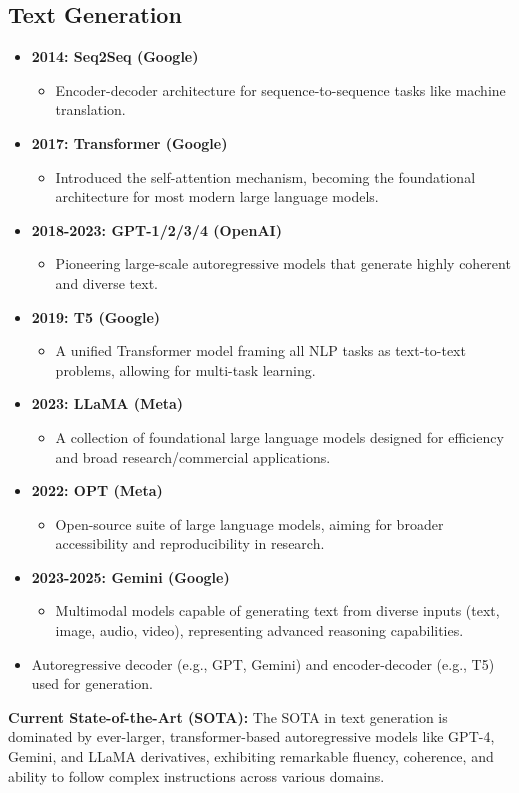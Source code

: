 \documentclass{article}
\begin{document}
\subsection{Text Generation}
\begin{itemize}[leftmargin=1.5em]
\item \textbf{2014: Seq2Seq (Google)}
  \begin{itemize}
    \item Encoder-decoder architecture for sequence-to-sequence tasks like machine translation.
  \end{itemize}
\item \textbf{2017: Transformer (Google)}
  \begin{itemize}
    \item Introduced the self-attention mechanism, becoming the foundational architecture for most modern large language models.
  \end{itemize}
\item \textbf{2018-2023: GPT-1/2/3/4 (OpenAI)}
  \begin{itemize}
    \item Pioneering large-scale autoregressive models that generate highly coherent and diverse text.
  \end{itemize}
\item \textbf{2019: T5 (Google)}
  \begin{itemize}
    \item A unified Transformer model framing all NLP tasks as text-to-text problems, allowing for multi-task learning.
  \end{itemize}
\item \textbf{2023: LLaMA (Meta)}
  \begin{itemize}
    \item A collection of foundational large language models designed for efficiency and broad research/commercial applications.
  \end{itemize}
\item \textbf{2022: OPT (Meta)}
  \begin{itemize}
    \item Open-source suite of large language models, aiming for broader accessibility and reproducibility in research.
  \end{itemize}
\item \textbf{2023-2025: Gemini (Google)}
  \begin{itemize}
    \item Multimodal models capable of generating text from diverse inputs (text, image, audio, video), representing advanced reasoning capabilities.
  \end{itemize}
\item Autoregressive decoder (e.g., GPT, Gemini) and encoder-decoder (e.g., T5) used for generation.
\end{itemize}
\textbf{Current State-of-the-Art (SOTA):} The SOTA in text generation is dominated by ever-larger, transformer-based autoregressive models like GPT-4, Gemini, and LLaMA derivatives, exhibiting remarkable fluency, coherence, and ability to follow complex instructions across various domains.
\end{document}
